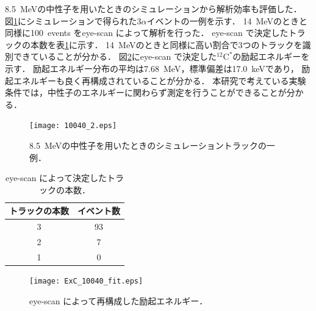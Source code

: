 \documentclass[../master]{subfiles}
\begin{document}
\SI{8.5}{\mega\electronvolt}の中性子を用いたときのシミュレーションから解析効率も評価した．
図\ref{fig::three_alpha_low_En}にシミュレーションで得られた3$\alpha$イベントの一例を示す．
\SI{14}{\mega\electronvolt}のときと同様に100~events をeye-scan によって解析を行った．
eye-scan で決定したトラックの本数を表\ref{tab::eye-scan_low}に示す．
\SI{14}{\mega\electronvolt}のときと同様に高い割合で3つのトラックを識別できていることが分かる．
図\ref{fig::ExC_low}にeye-scan で決定した${}^{12}\mathrm{C}^{*}$の励起エネルギーを示す．
励起エネルギー分布の平均は\SI{7.68}{\mega\electronvolt}，標準偏差は\SI{17.0}{\kilo\electronvolt}であり，
励起エネルギーも良く再構成されていることが分かる．
本研究で考えている実験条件では，中性子のエネルギーに関わらず測定を行うことができることが分かる．
\begin{figure}
  \centering
  \texttt{[image: 10040\_2.eps]}
  \caption{\SI{8.5}{\mega\electronvolt}の中性子を用いたときのシミュレーショントラックの一例．}
  \label{fig::three_alpha_low_En}
\end{figure}
\begin{table}
  \caption{eye-scan によって決定したトラックの本数．}
  \label{tab::eye-scan_low}
  \centering
  \begin{tabular}{cc}
    \toprule
    トラックの本数 & イベント数 \\
    \midrule
    3 & 93 \\
    2 & 7 \\
    1 & 0 \\
    \bottomrule
  \end{tabular}
\end{table}
\begin{figure}
  \centering
  \texttt{[image: ExC\_10040\_fit.eps]}
  \caption{eye-scan によって再構成した励起エネルギー．}
  \label{fig::ExC_low}
\end{figure}
\end{document}

